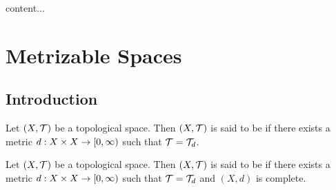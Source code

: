 \documentclass{book}
\begin{document}
\begin{defn}
	content...
\end{defn}









































































\newpage
\section{Metrizable Spaces}

\subsection{Introduction}

\begin{defn} 
	Let $(X, \mathcal{T})$ be a topological space. Then $(X, \mathcal{T})$ is said to be  if there exists a metric $d:X \times X \rightarrow [0,\infty)$ such that $\mathcal{T} = \mathcal{T}_d$.
\end{defn}

\begin{defn} 
	Let $(X, \mathcal{T})$ be a topological space. Then $(X, \mathcal{T})$ is said to be  if there exists a metric $d:X \times X \rightarrow [0,\infty)$ such that $\mathcal{T} = \mathcal{T}_d$ and $(X, d)$ is complete.
\end{defn}
\end{document}

